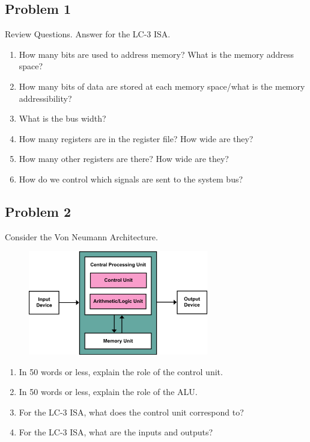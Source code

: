 \documentclass{article}
\begin{document}
\subsection*{Problem 1}
Review Questions. Answer for the LC-3 ISA.
\begin{enumerate}[label=\alph*.]
\item How many bits are used to address memory? What is the memory address space?
\item How many bits of data are stored at each memory space/what is the memory addressibility?
\item What is the bus width?
\item How many registers are in the register file? How wide are they?
\item How many other registers are there? How wide are they?
\item How do we control which signals are sent to the system bus?
\end{enumerate}

\subsection*{Problem 2}
Consider the Von Neumann Architecture.
\begin{figure}[!h]
    \centering
    \includegraphics[width=0.7\textwidth]{figures/von_neumann.png}
\end{figure}
\begin{enumerate}[label=\alph*]
\item In 50 words or less, explain the role of the control unit.
\item In 50 words or less, explain the role of the ALU.
\item For the LC-3 ISA, what does the control unit correspond to?
\item For the LC-3 ISA, what are the inputs and outputs?
\end{enumerate}

\newpage
\end{document}
